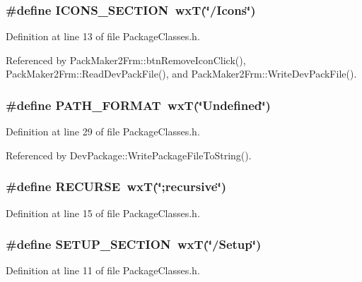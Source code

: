 \subsubsection{\setlength{\rightskip}{0pt plus 5cm}\#define ICONS\_\-SECTION~wx\-T(\char`\"{}/Icons\char`\"{})}\label{_package_classes_8h_d9f40406598a4be2625abd890274b3dc}




Definition at line 13 of file Package\-Classes.h.

Referenced by Pack\-Maker2Frm::btn\-Remove\-Icon\-Click(), Pack\-Maker2Frm::Read\-Dev\-Pack\-File(), and Pack\-Maker2Frm::Write\-Dev\-Pack\-File().
\subsubsection{\setlength{\rightskip}{0pt plus 5cm}\#define PATH\_\-FORMAT~wx\-T(\char`\"{}Undefined\char`\"{})}\label{_package_classes_8h_c8feab8724de9686c9dc8de9a991cd15}




Definition at line 29 of file Package\-Classes.h.

Referenced by Dev\-Package::Write\-Package\-File\-To\-String().
\subsubsection{\setlength{\rightskip}{0pt plus 5cm}\#define RECURSE~wx\-T(\char`\"{};recursive\char`\"{})}\label{_package_classes_8h_c0c299988aa45f396d7e7296bfa59851}




Definition at line 15 of file Package\-Classes.h.
\subsubsection{\setlength{\rightskip}{0pt plus 5cm}\#define SETUP\_\-SECTION~wx\-T(\char`\"{}/Setup\char`\"{})}\label{_package_classes_8h_2fbb5362780131f31dbb086eb5e3cded}




Definition at line 11 of file Package\-Classes.h.

